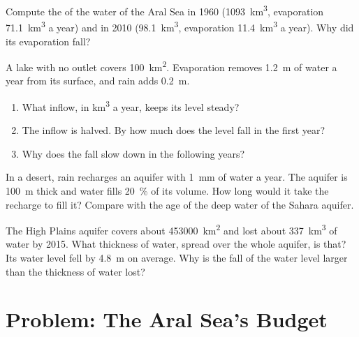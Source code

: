 \begin{exercise}[$\star\star\star$]\label{exo:g10:freshwater-resources:12}
Compute the  of the water of the Aral Sea in 1960
(\qty{1093}{km^3}, evaporation \qty{71.1}{km^3} a year) and in 2010
(\qty{98.1}{km^3}, evaporation \qty{11.4}{km^3} a year). Why did its
evaporation fall?
\end{exercise}

\begin{exercise}[$\star\star\star$]\label{exo:g10:freshwater-resources:13}
A lake with no outlet covers \qty{100}{km^2}. Evaporation removes
\qty{1.2}{m} of water a year from its surface, and rain adds \qty{0.2}{m}.
\begin{enumerate}
  \item What inflow, in \unit{km^3} a year, keeps its level steady?
  \item The inflow is halved. By how much does the level fall in the first
        year?
  \item Why does the fall slow down in the following years?
\end{enumerate}
\end{exercise}

\begin{exercise}[$\star\star\star$]\label{exo:g10:freshwater-resources:14}
In a desert, rain recharges an aquifer with \qty{1}{mm} of water a year.
The aquifer is \qty{100}{m} thick and water fills \qty{20}{\percent} of its
volume. How long would it take the recharge to fill it? Compare with the
age of the deep water of the Sahara aquifer.
\end{exercise}

\begin{exercise}[$\star\star\star$]\label{exo:g10:freshwater-resources:15}
The High Plains aquifer covers about \qty{453000}{km^2} and lost about
\qty{337}{km^3} of water by 2015. What thickness of water, spread over the
whole aquifer, is that? Its water level fell by \qty{4.8}{m} on average.
Why is the fall of the water level larger than the thickness of water lost?
\end{exercise}

\section{Problem: The Aral Sea's Budget}

